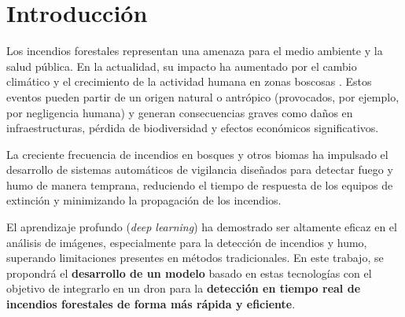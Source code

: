 \section{Introducción}
Los incendios forestales representan una amenaza para el medio ambiente y la salud pública.
En la actualidad, su impacto ha aumentado por el cambio climático y el crecimiento
de la actividad humana en zonas boscosas \cite{Bot2022}. Estos eventos pueden partir de un origen
natural o antrópico (provocados, por ejemplo, por negligencia humana) y generan
consecuencias graves como daños en infraestructuras, pérdida de biodiversidad y
efectos económicos significativos.

La creciente frecuencia de incendios en bosques y otros biomas ha impulsado el desarrollo
de sistemas automáticos de vigilancia diseñados para detectar fuego y humo de manera
temprana, reduciendo el tiempo de respuesta de los equipos de extinción y minimizando
la propagación de los incendios.

El aprendizaje profundo (\textit{deep learning}) ha demostrado ser altamente eficaz
en el análisis de imágenes, especialmente para la detección de incendios y humo,
superando limitaciones presentes en métodos tradicionales. En este trabajo,
se propondrá el \textbf{desarrollo de un modelo} basado en estas tecnologías con el
objetivo de integrarlo en un dron para la \textbf{detección en tiempo real de incendios
forestales de forma más rápida y eficiente}.

